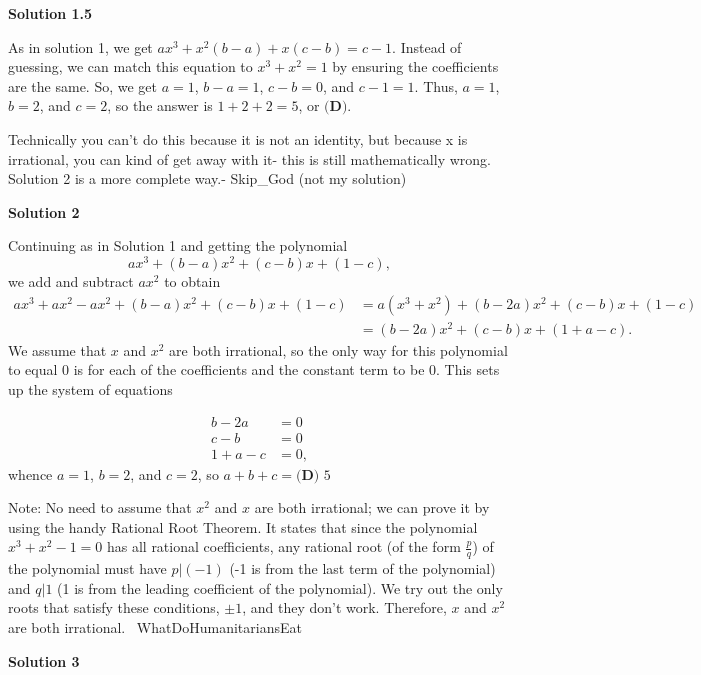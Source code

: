 \begin{enumerate}
 



\textbf{Solution 1.5}

As in solution 1, we get $ax^3+x^2(b-a)+x(c-b)=c-1$. Instead of guessing, we can match this equation to $x^3+x^2=1$ by ensuring the coefficients are the same. So, we get $a=1$, $b-a=1$, $c-b=0$, and $c-1=1$. Thus, $a=1$, $b=2$, and $c=2$, so the answer is $1+2+2=5$, or $\boxed{\textbf{(D)}}$.

 Technically you can’t do this because it is not an identity, but because x is irrational, you can kind of get away with it- this is still mathematically wrong. Solution 2 is a more complete way.- Skip\_God (not my solution)

 



\textbf{Solution 2}

Continuing as in Solution 1 and getting the polynomial
 \[ax^3 + (b-a)x^2 + (c-b)x + (1-c),\]we add and subtract $ax^2$ to obtain
 \begin{align*} ax^3 + ax^2 - ax^2 + (b-a)x^2 + (c-b)x + (1-c) &= a(x^3 + x^2) + (b-2a)x^2 + (c-b)x + (1-c) \\ &= (b-2a)x^2 + (c-b)x + (1+a-c). \end{align*}
We assume that $x$ and $x^2$ are both irrational, so the only way for this polynomial to equal $0$ is for each of the coefficients and the constant term to be $0$. This sets up the system of equations

 
 \begin{align*} b-2a &= 0\\ c-b &= 0\\ 1+a-c &= 0, \end{align*}
whence $a=1$, $b=2$, and $c=2$, so $a + b + c = \boxed{\textbf{(D) }5}$

 Note: No need to assume that $x^2$ and $x$ are both irrational; we can prove it by using the handy Rational Root Theorem. It states that since the polynomial $x^3+x^2-1=0$ has all rational coefficients, any rational root (of the form $\frac p q$) of the polynomial must have $p | (-1)$ (-1 is from the last term of the polynomial) and $q | 1$ (1 is from the leading coefficient of the polynomial). We try out the only roots that satisfy these conditions, $\pm1$, and they don't work. Therefore, $x$ and $x^2$ are both irrational.~ WhatDoHumanitariansEat

 



\textbf{Solution 3}


\end{enumerate}
